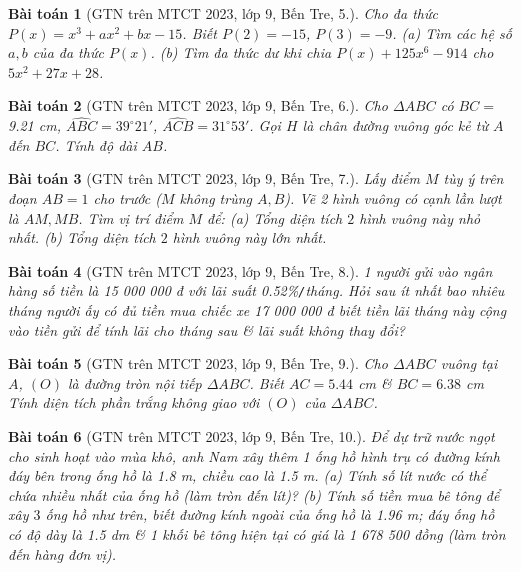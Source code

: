 \documentclass{article}
\newtheorem{baitoan}{Bài toán}
\begin{document}
\begin{baitoan}[GTN trên MTCT 2023, lớp 9, Bến Tre, 5.]
	Cho đa thức $P(x) = x^3 + ax^2 + bx - 15$. Biết $P(2) = -15$, $P(3) = -9$. (a) Tìm các hệ số $a,b$ của đa thức $P(x)$. (b) Tìm đa thức dư khi chia $P(x) + 125x^6 - 914$ cho $5x^2 + 27x + 28$.
\end{baitoan}

\begin{baitoan}[GTN trên MTCT 2023, lớp 9, Bến Tre, 6.]
	Cho $\Delta ABC$ có $BC =$ \emph{9.21 cm}, $\widehat{ABC} = 39^\circ21'$, $\widehat{ACB} = 31^\circ53'$. Gọi $H$ là chân đường vuông góc kẻ từ $A$ đến $BC$. Tính độ dài $AB$.
\end{baitoan}

\begin{baitoan}[GTN trên MTCT 2023, lớp 9, Bến Tre, 7.]
	Lấy điểm $M$ tùy ý trên đoạn $AB = 1$ cho trước ($M$ không trùng $A,B$). Vẽ 2 hình vuông có cạnh lần lượt là $AM,MB$. Tìm vị trí điểm $M$ để: (a) Tổng diện tích $2$ hình vuông này nhỏ nhất. (b) Tổng diện tích $2$ hình vuông này lớn nhất.
\end{baitoan}

\begin{baitoan}[GTN trên MTCT 2023, lớp 9, Bến Tre, 8.]
	1 người gửi vào ngân hàng số tiền là \emph{15 000 000 đ} với lãi suất \emph{0.52\%\texttt{/}tháng}. Hỏi sau ít nhất bao nhiêu tháng người ấy có đủ tiền mua chiếc xe \emph{17 000 000 đ} biết tiền lãi tháng này cộng vào tiền gửi để tính lãi cho tháng sau \& lãi suất không thay đổi? 
\end{baitoan}

\begin{baitoan}[GTN trên MTCT 2023, lớp 9, Bến Tre, 9.]
	Cho $\Delta ABC$ vuông tại $A$, $(O)$ là đường tròn nội tiếp $\Delta ABC$. Biết $AC = 5.44$ \emph{cm} \& $BC = 6.38$ \emph{cm} Tính diện tích phần trắng không giao với $(O)$ của $\Delta ABC$.
\end{baitoan}

\begin{baitoan}[GTN trên MTCT 2023, lớp 9, Bến Tre, 10.]
	Để dự trữ nước ngọt cho sinh hoạt vào mùa khô, anh Nam xây thêm 1 ống hồ hình trụ có đường kính đáy bên trong ống hồ là \emph{1.8 m}, chiều cao là \emph{1.5 m}. (a) Tính số lít nước có thể chứa nhiều nhất của ống hồ (làm tròn đến lít)? (b) Tính số tiền mua bê tông để xây $3$ ống hồ như trên, biết đường kính ngoài của ống hồ là \emph{1.96 m}; đáy ống hồ có độ dày là \emph{1.5 dm} \& 1 khối bê tông hiện tại có giá là \emph{1 678 500 đồng} (làm tròn đến hàng đơn vị).
\end{baitoan}


\printbibliography[heading=bibintoc]
	
\end{document}
